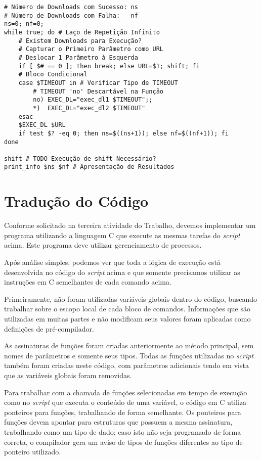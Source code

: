 \documentclass{article}
\begin{document}
\begin{small}
\begin{verbatim}
# Número de Downloads com Sucesso: ns
# Número de Downloads com Falha:   nf
ns=0; nf=0;
while true; do # Laço de Repetição Infinito
    # Existem Downloads para Execução?
    # Capturar o Primeiro Parâmetro como URL
    # Deslocar 1 Parâmetro à Esquerda
    if [ $# == 0 ]; then break; else URL=$1; shift; fi
    # Bloco Condicional
    case $TIMEOUT in # Verificar Tipo de TIMEOUT
        # TIMEOUT 'no' Descartável na Função
        no) EXEC_DL="exec_dl1 $TIMEOUT";;
        *)  EXEC_DL="exec_dl2 $TIMEOUT"
    esac
    $EXEC_DL $URL
    if test $? -eq 0; then ns=$((ns+1)); else nf=$((nf+1)); fi
done

shift # TODO Execução de shift Necessário?
print_info $ns $nf # Apresentação de Resultados
\end{verbatim}
\end{small}

\section{Tradução do Código}

Conforme solicitado na terceira atividade do Trabalho, devemos implementar um
programa utilizando a linguagem C que execute as mesmas tarefas do
\textit{script} acima. Este programa deve utilizar gerenciamento de processos.

Após análise simples, podemos ver que toda a lógica de execução está
desenvolvida no código do \textit{script} acima e que somente precisamos
utilizar as instruções em C semelhantes de cada comando acima.

Primeiramente, não foram utilizadas variáveis globais dentro do código,
buscando trabalhar sobre o escopo local de cada bloco de comandos. Informações
que são utilizadas em muitas partes e não modificam seus valores foram aplicadas
como definições de pré-compilador.

As assinaturas de funções foram criadas anteriormente ao método principal, sem
nomes de parâmetros e somente seus tipos. Todas as funções utilizadas no
\textit{script} também foram criadas neste código, com parâmetros adicionais
tendo em vista que as variáveis globais foram removidas.

Para trabalhar com a chamada de funções selecionadas em tempo de execução como
no \textit{script} que executa o conteúdo de uma variável, o código em C utiliza
ponteiros para funções, trabalhando de forma semelhante. Os ponteiros para
funções devem apontar para estruturas que possuem a mesma assinatura,
trabalhando como um tipo de dado; caso isto não seja programado de forma
correta, o compilador gera um aviso de tipos de funções diferentes ao tipo de
ponteiro utilizado.
\end{document}

